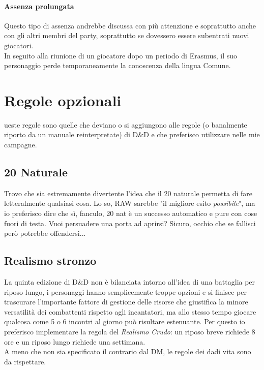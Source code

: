 \paragraph{Assenza prolungata}

Questo tipo di assenza andrebbe discussa con più attenzione e soprattutto anche con gli altri membri del party, soprattutto se dovessero essere subentrati nuovi giocatori. \\ In seguito alla riunione di un giocatore dopo un periodo di Erasmus, il suo personaggio perde temporaneamente la conoscenza della lingua Comune.

\section{Regole opzionali}

ueste regole sono quelle che deviano o si aggiungono alle regole (o banalmente riporto da un manuale reinterpretate) di D\&D e che preferisco utilizzare nelle mie campagne.

\subsection{20 Naturale}

Trovo che sia estremamente divertente l'idea che il 20 naturale permetta di fare letteralmente qualsiasi cosa. Lo so, RAW sarebbe "il migliore esito \textit{possibile}", ma io preferisco dire che sì, fanculo, 20 nat è un successo automatico e pure con cose fuori di testa. Vuoi persuadere una porta ad aprirsi? Sicuro, occhio che se fallisci però potrebbe offendersi...

\subsection{Realismo stronzo}

La quinta edizione di D\&D non è bilanciata intorno all'idea di una battaglia per riposo lungo, i personaggi hanno semplicemente troppe opzioni e si finisce per trascurare l'importante fattore di gestione delle risorse che giustifica la minore versatilità dei combattenti rispetto agli incantatori, ma allo stesso tempo giocare qualcosa come 5 o 6 incontri al giorno può risultare estenuante. Per questo io preferisco implementare la regola del \textit{Realismo Crudo}: un riposo breve richiede 8 ore e un riposo lungo richiede una settimana. \\ A meno che non sia specificato il contrario dal DM, le regole dei dadi vita sono da rispettare.

